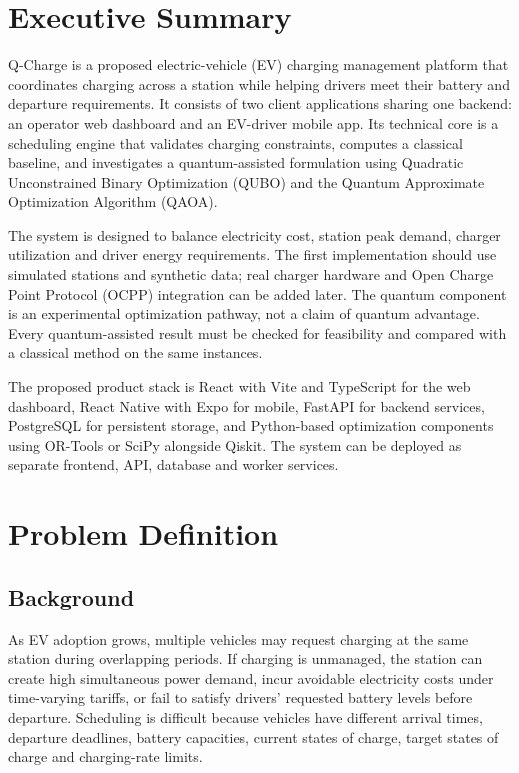 \documentclass[11pt,a4paper]{article}
\begin{document}
\tableofcontents
\newpage

\section{Executive Summary}

Q-Charge is a proposed electric-vehicle (EV) charging management platform that coordinates charging across a station while helping drivers meet their battery and departure requirements. It consists of two client applications sharing one backend: an operator web dashboard and an EV-driver mobile app. Its technical core is a scheduling engine that validates charging constraints, computes a classical baseline, and investigates a quantum-assisted formulation using Quadratic Unconstrained Binary Optimization (QUBO) and the Quantum Approximate Optimization Algorithm (QAOA).

The system is designed to balance electricity cost, station peak demand, charger utilization and driver energy requirements. The first implementation should use simulated stations and synthetic data; real charger hardware and Open Charge Point Protocol (OCPP) integration can be added later. The quantum component is an experimental optimization pathway, not a claim of quantum advantage. Every quantum-assisted result must be checked for feasibility and compared with a classical method on the same instances.

The proposed product stack is React with Vite and TypeScript for the web dashboard, React Native with Expo for mobile, FastAPI for backend services, PostgreSQL for persistent storage, and Python-based optimization components using OR-Tools or SciPy alongside Qiskit. The system can be deployed as separate frontend, API, database and worker services.

\section{Problem Definition}

\subsection{Background}

As EV adoption grows, multiple vehicles may request charging at the same station during overlapping periods. If charging is unmanaged, the station can create high simultaneous power demand, incur avoidable electricity costs under time-varying tariffs, or fail to satisfy drivers' requested battery levels before departure. Scheduling is difficult because vehicles have different arrival times, departure deadlines, battery capacities, current states of charge, target states of charge and charging-rate limits.
\end{document}
